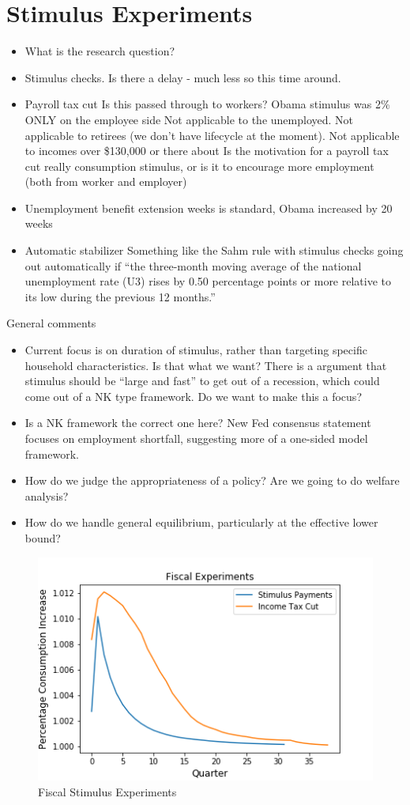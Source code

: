 \documentclass[]{article}
\begin{document}
\section{Stimulus Experiments}


\begin{itemize}
	\item What is the research question?
	\item Stimulus checks. Is there a delay - much less so this time around.
	\item Payroll tax cut
	\subitem Is this passed through to workers? Obama stimulus was 2\% ONLY on the employee side
	\subitem Not applicable to the unemployed. 
	\subitem Not applicable to retirees (we don't have lifecycle at the moment).
	\subitem Not applicable to incomes over \$130,000 or there about
	\subitem Is the motivation for a payroll tax cut really consumption stimulus, or is it to encourage more employment (both from worker and employer)
	\item Unemployment benefit extension
	 weeks is standard, Obama increased by 20 weeks
	\item Automatic stabilizer
	\subitem Something like the Sahm rule with stimulus checks going out automatically if ``the three-month moving average of the national unemployment rate (U3) rises by 0.50 percentage points or more relative to its low during the previous 12 months.''
\end{itemize}

General comments
\begin{itemize}
	\item Current focus is on duration of stimulus, rather than targeting specific household characteristics. Is that what we want? There is a argument that stimulus should be ``large and fast'' to get out of a recession, which could come out of a NK type framework. Do we want to make this a focus?
	\item Is a NK framework the correct one here? New Fed consensus statement focuses on employment shortfall, suggesting more of a one-sided model framework.
	\item How do we judge the appropriateness of a policy? Are we going to do welfare analysis?
	\item How do we handle general equilibrium, particularly at the effective lower bound?
\end{itemize}

	\begin{figure} 
	\begin{centering}
		\includegraphics[scale=0.85]{./Figures/FiscalExperiments.png}
		\caption{Fiscal Stimulus Experiments}
		\label{fig:Fiscal_experiments}
	\end{centering}
	\end{figure}
\end{document}
